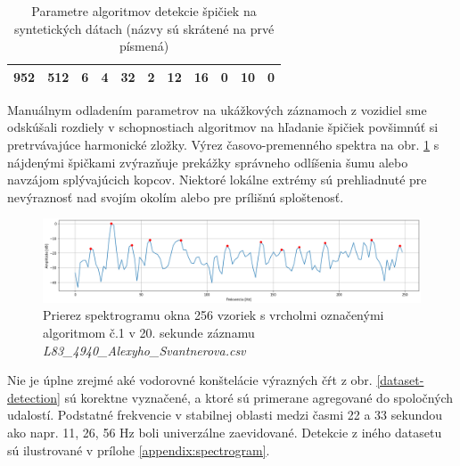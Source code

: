 \begin{table}[h]
\begin{tabular}{|c|c|ccc|cc|cccc|}
952                                                                               & 512                                                                     & \multicolumn{1}{c|}{6}           & \multicolumn{1}{c|}{4}                  & 32                & \multicolumn{1}{c|}{2}                                 & 12                                & \multicolumn{1}{c|}{16}  & \multicolumn{1}{c|}{0}   & \multicolumn{1}{c|}{10}  & 0   \\ \hline
\end{tabular}
\caption{Parametre algoritmov detekcie špičiek na syntetických dátach (názvy sú skrátené na prvé písmená)}
\label{tab:grid-serach-parameters}
\end{table}

Manuálnym odladením parametrov na ukážkových záznamoch z vozidiel sme odskúšali rozdiely v schopnostiach algoritmov
na hľadanie špičiek povšimnúť si pretrvávajúce harmonické zložky. Výrez časovo-premenného spektra na obr. \ref{spectrum-slice}
s nájdenými špičkami zvýrazňuje prekážky správneho odlíšenia šumu alebo navzájom splývajúcich kopcov. Niektoré lokálne extrémy
sú prehliadnuté pre nevýraznosť nad svojím okolím alebo pre prílišnú sploštenosť.
\begin{figure}[h]
   \centering
    \includegraphics[width=\textwidth]{figures/verification/L83-slice-t-20-A1.png}
   \caption{Prierez spektrogramu okna 256 vzoriek s vrcholmi označenými algoritmom č.1
   v 20. sekunde záznamu \emph{L83\_4940\_Alexyho\_Svantnerova.csv}}
   \label{spectrum-slice}
\end{figure}

Nie je úplne zrejmé aké vodorovné konštelácie výrazných čŕt z obr. \ref{dataset-detection} sú korektne vyznačené,
a ktoré sú primerane agregované do spoločných udalostí. Podstatné frekvencie v stabilnej oblasti medzi časmi 22 a 33
sekundou ako napr. 11, 26, 56 Hz  boli univerzálne zaevidované. Detekcie z iného datasetu sú ilustrované v prílohe
\ref{appendix:spectrogram}.

